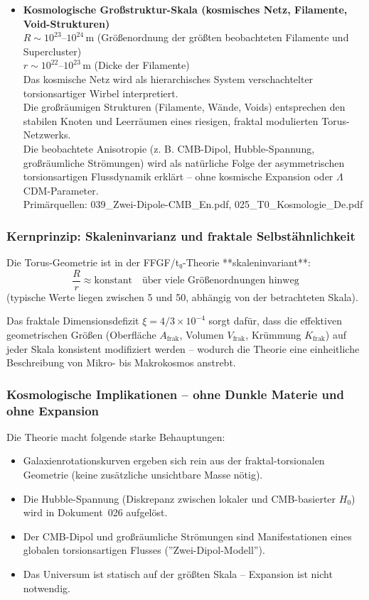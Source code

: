 \begin{itemize}
		\item \textbf{Kosmologische Großstruktur-Skala (kosmisches Netz, Filamente, Void-Strukturen)} \\
		$R \sim 10^{23}$–$10^{24}\,\text{m}$ (Größenordnung der größten beobachteten Filamente und Supercluster) \\
		$r \sim 10^{22}$–$10^{23}\,\text{m}$ (Dicke der Filamente) \\
		Das kosmische Netz wird als hierarchisches System verschachtelter torsionsartiger Wirbel interpretiert. \\
		Die großräumigen Strukturen (Filamente, Wände, Voids) entsprechen den stabilen Knoten und Leerräumen eines riesigen, fraktal modulierten Torus-Netzwerks. \\
		Die beobachtete Anisotropie (z. B. CMB-Dipol, Hubble-Spannung, großräumliche Strömungen) wird als natürliche Folge der asymmetrischen torsionsartigen Flussdynamik erklärt – ohne kosmische Expansion oder $\Lambda$CDM-Parameter. \\
		Primärquellen: 039\_Zwei-Dipole-CMB\_En.pdf, 025\_T0\_Kosmologie\_De.pdf
	\end{itemize}
	
	\subsubsection{Kernprinzip: Skaleninvarianz und fraktale Selbstähnlichkeit}
	
	Die Torus-Geometrie ist in der FFGF/t₀-Theorie **skaleninvariant**:
	\[
	\frac{R}{r} \approx \text{konstant} \quad \text{über viele Größenordnungen hinweg}
	\]
	(typische Werte liegen zwischen 5 und 50, abhängig von der betrachteten Skala).
	
	Das fraktale Dimensionsdefizit $\xi = 4/3 \times 10^{-4}$ sorgt dafür, dass die effektiven geometrischen Größen (Oberfläche $A_{\text{frak}}$, Volumen $V_{\text{frak}}$, Krümmung $K_{\text{frak}}$) auf jeder Skala konsistent modifiziert werden – wodurch die Theorie eine einheitliche Beschreibung von Mikro- bis Makrokosmos anstrebt.
	
	\subsubsection{Kosmologische Implikationen – ohne Dunkle Materie und ohne Expansion}
	
	Die Theorie macht folgende starke Behauptungen:
	\begin{itemize}
		\item Galaxienrotationskurven ergeben sich rein aus der fraktal-torsionalen Geometrie (keine zusätzliche unsichtbare Masse nötig).
		\item Die Hubble-Spannung (Diskrepanz zwischen lokaler und CMB-basierter $H_0$) wird in Dokument~026 aufgelöst.
		\item Der CMB-Dipol und großräumliche Strömungen sind Manifestationen eines globalen torsionsartigen Flusses (''Zwei-Dipol-Modell'').
		\item Das Universum ist statisch auf der größten Skala – Expansion ist nicht notwendig.
	\end{itemize}
	
